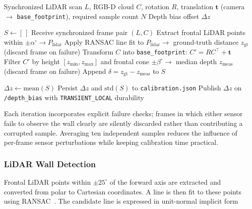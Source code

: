 \begin{algorithm}[htbp]
\caption{RANSAC Depth-Bias Calibration}
\label{alg:calibration}
\begin{algorithmic}[1]
\renewcommand{\algorithmicrequire}{\textbf{Input:}}
\renewcommand{\algorithmicensure}{\textbf{Output:}}
\REQUIRE Synchronized LiDAR scan $L$, RGB-D cloud $C$, rotation $R$, translation $\mathbf{t}$ (camera $\rightarrow$ \texttt{base\_footprint}), required sample count $N$
\ENSURE Depth bias offset $\Delta z$

\STATE $S \leftarrow [\,]$
    \STATE Receive synchronized frame pair $(L, C)$
    \STATE Extract frontal LiDAR points within $\pm\alpha^{\circ} \rightarrow P_{\text{lidar}}$
    \STATE Apply RANSAC line fit to $P_{\text{lidar}} \rightarrow$ ground-truth distance $z_{\text{gt}}$ \quad (discard frame on failure)
    \STATE Transform $C$ into \texttt{base\_footprint}: $C' = RC^{\top} + \mathbf{t}$
    \STATE Filter $C'$ by height $[z_{\min}, z_{\max}]$ and frontal cone $\pm\beta^{\circ} \rightarrow$ median depth $z_{\text{meas}}$ \quad (discard frame on failure)
    \STATE Append $\delta = z_{\text{gt}} - z_{\text{meas}}$ to $S$
\ENDWHILE

\STATE $\Delta z \leftarrow \text{mean}(S)$
\STATE Persist $\Delta z$ and $\text{std}(S)$ to \texttt{calibration.json}
\STATE Publish $\Delta z$ on \texttt{/depth\_bias} with \texttt{TRANSIENT\_LOCAL} durability
\end{algorithmic}
\end{algorithm}

Each iteration incorporates explicit failure checks; frames in which
either sensor fails to observe the wall clearly are silently discarded
rather than contributing a corrupted sample. Averaging ten independent
samples reduces the influence of per-frame sensor perturbations while
keeping calibration time practical.

\subsubsection{LiDAR Wall Detection}

Frontal LiDAR points within $\pm 25^{\circ}$ of the forward axis are
extracted and converted from polar to Cartesian coordinates. A line is
then fit to these points using RANSAC~\cite{delhibabu2026}. The
candidate line is expressed in unit-normal implicit form

